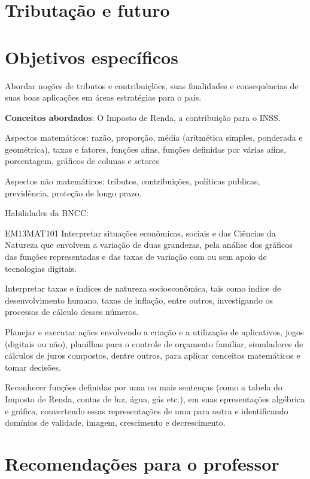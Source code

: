 \begin{paginatexto2}
\section*{Tributação e futuro}
\section*{Objetivos específicos}
Abordar noções de tributos e contribuiçlões, suas finalidades e consequências de suas boas aplicações em áreas estratégias para o país.

\textbf{Conceitos abordados}: O Imposto de Renda, a contribuição para o INSS.

Aspectos matemáticos: razão, proporção, média (aritmética simples, ponderada e geométrica), taxas e fatores, funções afins, funções definidas por várias afins, porcentagem, gráficos de colunas e setores

Aspectos não matemáticos: tributos, contribuições, políticas publicas, previdência, proteção de longo prazo.

Habilidades da BNCC:

\begin{objetivos}{EM13MAT101}
 Interpretar situações econômicas, sociais e das Ciências da Natureza
que envolvem a variação de duas grandezas, pela análise dos gráficos das funções representadas e das taxas de variação com ou sem apoio de tecnologias digitais.


Interpretar taxas e índices de natureza socioeconômica, tais como índice de desenvolvimento humano, taxas de inflação, entre outros, investigando os processos de cálculo desses números.

Planejar e executar ações envolvendo a criação e a utilização de aplicativos, jogos (digitais ou não), planilhas para o controle de orçamento familiar, simuladores de cálculos de juros compostos, dentre outros, para aplicar conceitos matemáticos e tomar decisões. 

Reconhecer funções definidas por uma ou mais sentenças (como a tabela do Imposto de Renda, contas de luz, água, gás etc.), em suas epresentações algébrica e gráfica, convertendo essas representações de uma para outra e identificando domínios de validade, imagem, crescimento e decrescimento.
\end{objetivos}

\section*{Recomendações para o professor}


\end{paginatexto2}
